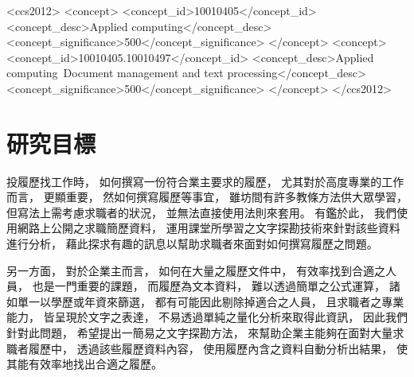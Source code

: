 \documentclass[acmsmall]{acmart}
\begin{document}
\begin{CCSXML}
<ccs2012>
   <concept>
       <concept_id>10010405</concept_id>
       <concept_desc>Applied computing</concept_desc>
       <concept_significance>500</concept_significance>
       </concept>
   <concept>
       <concept_id>10010405.10010497</concept_id>
       <concept_desc>Applied computing~Document management and text processing</concept_desc>
       <concept_significance>500</concept_significance>
       </concept>
 </ccs2012>
\end{CCSXML}

\maketitle

\section{研究目標}

投履歷找工作時，
如何撰寫一份符合業主要求的履歷，
尤其對於高度專業的工作而言，
更顯重要，
然如何撰寫履歷等事宜，
雖坊間有許多教條方法供大眾學習，
但寫法上需考慮求職者的狀況，
並無法直接使用法則來套用。
有鑑於此，
我們使用網路上公開之求職簡歷資料，
運用課堂所學習之文字探勘技術來針對該些資料進行分析，
藉此探求有趣的訊息以幫助求職者來面對如何撰寫履歷之問題。

另一方面，
對於企業主而言，
如何在大量之履歷文件中，
有效率找到合適之人員，
也是一門重要的課題，
而履歷為文本資料，
難以透過簡單之公式運算，
諸如單一以學歷或年資來篩選，
都有可能因此剔除掉適合之人員，
且求職者之專業能力，
皆呈現於文字之表達，
不易透過單純之量化分析來取得此資訊，
因此我們針對此問題，
希望提出一簡易之文字探勘方法，
來幫助企業主能夠在面對大量求職者履歷中，
透過該些履歷資料內容，
使用履歷內含之資料自動分析出結果，
使其能有效率地找出合適之履歷。
\end{document}
